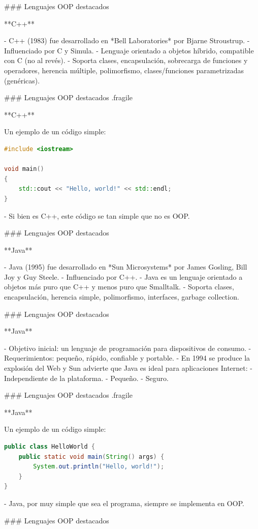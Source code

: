 ### Lenguajes OOP destacados

**C++**

- C++ (1983) fue desarrollado en *Bell Laboratories* por Bjarne Stroustrup.
- Influenciado por C y Simula.
- Lenguaje orientado a objetos híbrido, compatible con C (no al revés).
- Soporta clases, encapsulación, sobrecarga de funciones y operadores, herencia múltiple, polimorfismo, clases/funciones parametrizadas (genéricas).


### Lenguajes OOP destacados {.fragile}

**C++**\vfill

Un ejemplo de un código simple:
\begin{lstlisting}[language=C++]
#include <iostream>

void main()
{
    std::cout << "Hello, world!" << std::endl;
}
\end{lstlisting}

- Si bien es C++, este código se tan simple que no es OOP.

### Lenguajes OOP destacados

**Java**

- Java (1995) fue desarrollado en *Sun Microsystems* por James Gosling, Bill Joy y Guy Steele.
- Influenciado por C++.
- Java es un lenguaje orientado a objetos más puro que C++ y menos puro que Smalltalk.
- Soporta clases, encapsulación, herencia simple, polimorfismo, interfaces, garbage collection.

### Lenguajes OOP destacados

**Java**

- Objetivo inicial: un lenguaje de programación para dispositivos de consumo.
- Requerimientos: pequeño, rápido, confiable y portable.
- En 1994 se produce la explosión del Web y Sun advierte que Java es ideal para aplicaciones Internet:
    - Independiente de la plataforma.
    - Pequeño.
    - Seguro.

### Lenguajes OOP destacados {.fragile}

**Java**\vfill

Un ejemplo de un código simple:
\begin{lstlisting}[language=Java]
public class HelloWorld {
    public static void main(String() args) {
        System.out.println("Hello, world!");
    }
}
\end{lstlisting}

- Java, por muy simple que sea el programa, siempre se implementa en OOP.

### Lenguajes OOP destacados

